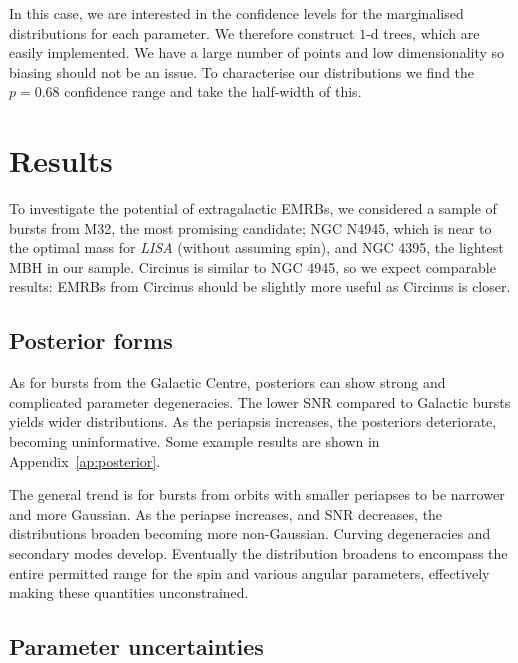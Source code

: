 \documentclass[useAMS,usedcolumn,usegraphicx,usenatbib]{mn2e}
\newcommand{\apref}[1]{Appendix~\ref{ap:#1}}
\begin{document}
In this case, we are interested in the confidence levels for the marginalised distributions for each parameter. We therefore construct $1$-d trees, which are easily implemented. We have a large number of points and low dimensionality so biasing should not be an issue. To characterise our distributions we find the $p = 0.68$ confidence range and take the half-width of this.

\section{Results}\label{sec:Res}

To investigate the potential of extragalactic EMRBs, we considered a sample of bursts from M32, the most promising candidate; NGC N4945, which is near to the optimal mass for \textit{LISA} (without assuming spin), and NGC 4395, the lightest MBH in our sample. Circinus is similar to NGC 4945, so we expect comparable results: EMRBs from Circinus should be slightly more useful as Circinus is closer.

\subsection{Posterior forms}

As for bursts from the Galactic Centre, posteriors can show strong and complicated parameter degeneracies. The lower SNR compared to Galactic bursts yields wider distributions. As the periapsis increases, the posteriors deteriorate, becoming uninformative. Some example results are shown in \apref{posterior}.

The general trend is for bursts from orbits with smaller periapses to be narrower and more Gaussian. As the periapse increases, and SNR decreases, the distributions broaden becoming more non-Gaussian. Curving degeneracies and secondary modes develop. Eventually the distribution broadens to encompass the entire permitted range for the spin and various angular parameters, effectively making these quantities unconstrained.

\subsection{Parameter uncertainties}
\end{document}
